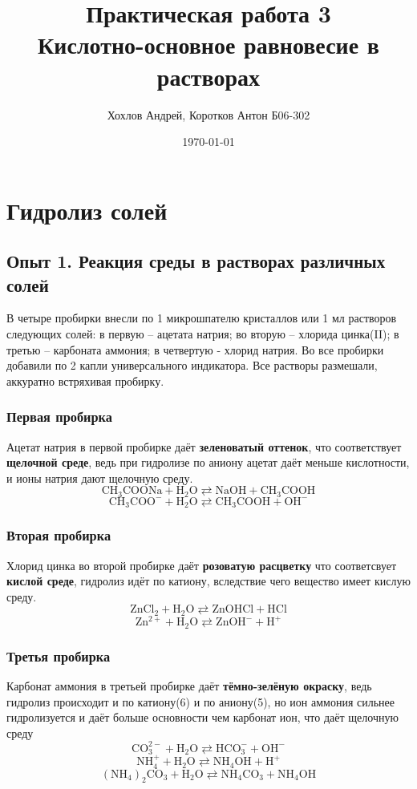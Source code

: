 \documentclass[a4paper,12pt]{article}
\author{Хохлов Андрей, Коротков Антон Б06-302}
\title{Практическая работа 3 \\
	\textbf{Кислотно-основное равновесие в растворах}}
\date{\today}
\begin{document}
{\large\maketitle}

\section{Гидролиз солей}
\subsection{Опыт 1. Реакция среды в растворах различных солей}
В четыре пробирки внесли по 1 микрошпателю кристаллов или 1 мл растворов
следующих солей: в первую – ацетата натрия; во вторую – хлорида цинка(II); в третью
– карбоната аммония; в четвертую - хлорид натрия.  Во все пробирки добавили по 2 капли универсального
индикатора. Все растворы размешали, аккуратно встряхивая пробирку.
\subsubsection{Первая пробирка}
Ацетат натрия в первой пробирке даёт  \textbf{зеленоватый оттенок}, что соответствует  \textbf{щелочной среде}, ведь при гидролизе по аниону ацетат даёт меньше кислотности, и ионы натрия дают щелочную среду.
\begin{equation}
\mathrm{CH_3COONa + H_2O \rightleftarrows NaOH + CH_3COOH}
\end{equation}
\begin{equation}
\mathrm{CH_3COO^- + H_2O \rightleftarrows CH_3COOH + OH^-}
\end{equation}
\subsubsection{Вторая пробирка}
Хлорид цинка во второй пробирке даёт \textbf{розоватую расцветку} что соответсвует \textbf{кислой среде}, гидролиз идёт по катиону, вследствие чего вещество имеет кислую среду.
\begin{equation}
\mathrm{ZnCl_2 + H_2O \rightleftarrows ZnOHCl + HCl}
\end{equation}
\begin{equation}
\mathrm{Zn^{2+} + H_2O \rightleftarrows ZnOH^- + H^+}
\end{equation}
\subsubsection{Третья пробирка}
Карбонат аммония в третьей пробирке даёт \textbf{тёмно-зелёную окраску}, ведь гидролиз происходит и по катиону(6) и по аниону(5), но ион аммония сильнее гидролизуется и даёт больше основности чем карбонат ион, что даёт щелочную среду
\begin{equation}
\mathrm{CO_3^{2-} + H_2O \rightleftarrows HCO_3^- + OH^-  }
\end{equation}
\begin{equation}
\mathrm{NH_4^+ + H_2O \rightleftarrows NH_4OH + H^+ }
\end{equation}
\begin{equation}
\mathrm{(NH_4)_2CO_3 + H_2O \rightleftarrows NH_4CO_3 + NH_4OH }
\end{equation}
\end{document}
